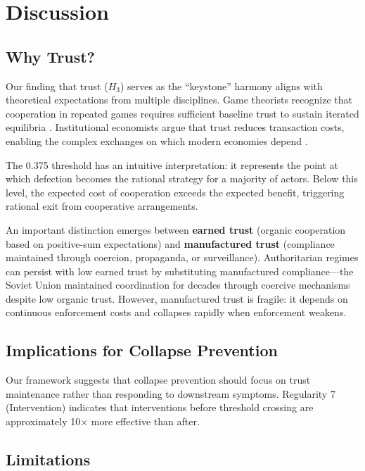 \documentclass[11pt,a4paper]{article}
\newcommand{\Hthree}{H_3}
\begin{document}
\section{Discussion}

\subsection{Why Trust?}

Our finding that trust ($\Hthree$) serves as the ``keystone'' harmony aligns with theoretical expectations from multiple disciplines. Game theorists recognize that cooperation in repeated games requires sufficient baseline trust to sustain iterated equilibria \citep{axelrod1984}. Institutional economists argue that trust reduces transaction costs, enabling the complex exchanges on which modern economies depend \citep{north1990}.

The 0.375 threshold has an intuitive interpretation: it represents the point at which defection becomes the rational strategy for a majority of actors. Below this level, the expected cost of cooperation exceeds the expected benefit, triggering rational exit from cooperative arrangements.

An important distinction emerges between \textbf{earned trust} (organic cooperation based on positive-sum expectations) and \textbf{manufactured trust} (compliance maintained through coercion, propaganda, or surveillance). Authoritarian regimes can persist with low earned trust by substituting manufactured compliance---the Soviet Union maintained coordination for decades through coercive mechanisms despite low organic trust. However, manufactured trust is fragile: it depends on continuous enforcement costs and collapses rapidly when enforcement weakens.

\subsection{Implications for Collapse Prevention}

Our framework suggests that collapse prevention should focus on trust maintenance rather than responding to downstream symptoms. Regularity 7 (Intervention) indicates that interventions before threshold crossing are approximately 10$\times$ more effective than after.

\subsection{Limitations}
\end{document}
